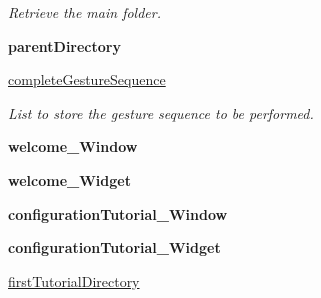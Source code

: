 \begin{DoxyCompactItemize}
\begin{DoxyCompactList}\small\item\em Retrieve the main folder. \end{DoxyCompactList}\item 
{\bfseries parent\+Directory}\hypertarget{classGUI__node_1_1MainWindow_a9eb8e938708adaffeb60bb74c39bd71c}{}\label{classGUI__node_1_1MainWindow_a9eb8e938708adaffeb60bb74c39bd71c}

\item 
\hyperlink{classGUI__node_1_1MainWindow_ad50097b037ad87eeef2243f2ec4194dd}{complete\+Gesture\+Sequence}
\begin{DoxyCompactList}\small\item\em List to store the gesture sequence to be performed. \end{DoxyCompactList}\item 
{\bfseries welcome\+\_\+\+Window}\hypertarget{classGUI__node_1_1MainWindow_a75ba2a822d88adf61f3d2e29480b54ed}{}\label{classGUI__node_1_1MainWindow_a75ba2a822d88adf61f3d2e29480b54ed}

\item 
{\bfseries welcome\+\_\+\+Widget}\hypertarget{classGUI__node_1_1MainWindow_a8403ef9c59e8b4b64797cb7628a3e4cd}{}\label{classGUI__node_1_1MainWindow_a8403ef9c59e8b4b64797cb7628a3e4cd}

\item 
{\bfseries configuration\+Tutorial\+\_\+\+Window}\hypertarget{classGUI__node_1_1MainWindow_a5ff5e55c9ced8975fa58ee08ccbdcec8}{}\label{classGUI__node_1_1MainWindow_a5ff5e55c9ced8975fa58ee08ccbdcec8}

\item 
{\bfseries configuration\+Tutorial\+\_\+\+Widget}\hypertarget{classGUI__node_1_1MainWindow_af81587b11d89cbca1b00aecf059d8ee7}{}\label{classGUI__node_1_1MainWindow_af81587b11d89cbca1b00aecf059d8ee7}

\item 
\hyperlink{classGUI__node_1_1MainWindow_a79061358e7ad20c614b2a60c12ef7691}{first\+Tutorial\+Directory}\hypertarget{classGUI__node_1_1MainWindow_a79061358e7ad20c614b2a60c12ef7691}{}\label{classGUI__node_1_1MainWindow_a79061358e7ad20c614b2a60c12ef7691}


\end{DoxyCompactItemize}
